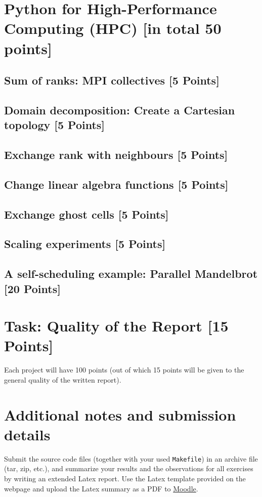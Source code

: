 \documentclass[unicode,11pt,a4paper,oneside,numbers=endperiod,openany]{scrartcl}
\begin{document}
\section{Python for High-Performance Computing (HPC) [in total 50 points]}

\subsection{Sum of ranks: MPI collectives [5 Points]}

\subsection{Domain decomposition: Create a Cartesian topology [5 Points]}

\subsection{Exchange rank with neighbours [5 Points]}

\subsection{Change linear algebra functions [5 Points]}

\subsection{Exchange ghost cells [5 Points]}

\subsection{Scaling experiments [5 Points]}

\subsection{A self-scheduling example: Parallel Mandelbrot [20 Points]}


\section{Task:  Quality of the Report [15 Points]}
Each project will have 100 points (out of  which 15 points will be given to the general quality of the written report).


\section*{Additional notes and submission details}
Submit the source code files (together with your used \texttt{Makefile}) in
an archive file (tar, zip, etc.), and summarize your results and the
observations for all exercises by writing an extended Latex report.
Use the Latex template provided on the webpage and upload the Latex summary
as a PDF to \href{https://moodle-app2.let.ethz.ch/course/view.php?id=14316}{Moodle}.
\end{document}
